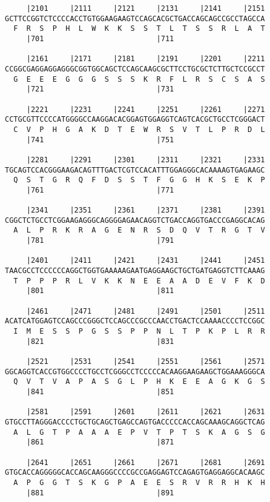 \documentclass{article}
\begin{document}
\begin{Verbatim}
     |2101     |2111     |2121     |2131     |2141     |2151
GCTTCCGGTCTCCCCACCTGTGGAAGAAGTCCAGCACGCTGACCAGCAGCCGCCTAGCCA
  F  R  S  P  H  L  W  K  K  S  S  T  L  T  S  S  R  L  A  T
     |701                          |711                     
  
     |2161     |2171     |2181     |2191     |2201     |2211
CCGGCGAGGAGGAGGGCGGTGGCAGCTCCAGCAAGCGCTTCCTGCGCTCTTGCTCCGCCT
  G  E  E  E  G  G  G  S  S  S  K  R  F  L  R  S  C  S  A  S
     |721                          |731                     
  
     |2221     |2231     |2241     |2251     |2261     |2271
CCTGCGTTCCCCATGGGGCCAAGGACACGGAGTGGAGGTCAGTCACGCTGCCTCGGGACT
  C  V  P  H  G  A  K  D  T  E  W  R  S  V  T  L  P  R  D  L
     |741                          |751                     
  
     |2281     |2291     |2301     |2311     |2321     |2331
TGCAGTCCACGGGAAGACAGTTTGACTCGTCCACATTTGGAGGGCACAAAAGTGAGAAGC
  Q  S  T  G  R  Q  F  D  S  S  T  F  G  G  H  K  S  E  K  P
     |761                          |771                     
  
     |2341     |2351     |2361     |2371     |2381     |2391
CGGCTCTGCCTCGGAAGAGGGCAGGGGAGAACAGGTCTGACCAGGTGACCCGAGGCACAG
  A  L  P  R  K  R  A  G  E  N  R  S  D  Q  V  T  R  G  T  V
     |781                          |791                     
  
     |2401     |2411     |2421     |2431     |2441     |2451
TAACGCCTCCCCCCAGGCTGGTGAAAAAGAATGAGGAAGCTGCTGATGAGGTCTTCAAAG
  T  P  P  P  R  L  V  K  K  N  E  E  A  A  D  E  V  F  K  D
     |801                          |811                     
  
     |2461     |2471     |2481     |2491     |2501     |2511
ACATCATGGAGTCCAGCCCGGGCTCCAGCCCGCCCAACCTGACTCCAAAACCCCTCCGGC
  I  M  E  S  S  P  G  S  S  P  P  N  L  T  P  K  P  L  R  R
     |821                          |831                     
  
     |2521     |2531     |2541     |2551     |2561     |2571
GGCAGGTCACCGTGGCCCCTGCCTCGGGCCTCCCCCACAAGGAAGAAGCTGGAAAGGGCA
  Q  V  T  V  A  P  A  S  G  L  P  H  K  E  E  A  G  K  G  S
     |841                          |851                     
  
     |2581     |2591     |2601     |2611     |2621     |2631
GTGCCTTAGGGACCCCTGCTGCAGCTGAGCCAGTGACCCCCACCAGCAAAGCAGGCTCAG
  A  L  G  T  P  A  A  A  E  P  V  T  P  T  S  K  A  G  S  G
     |861                          |871                     
  
     |2641     |2651     |2661     |2671     |2681     |2691
GTGCACCAGGGGGCACCAGCAAGGGCCCCGCCGAGGAGTCCAGAGTGAGGAGGCACAAGC
  A  P  G  G  T  S  K  G  P  A  E  E  S  R  V  R  R  H  K  H
     |881                          |891                     
  

\end{Verbatim}
\end{document}
